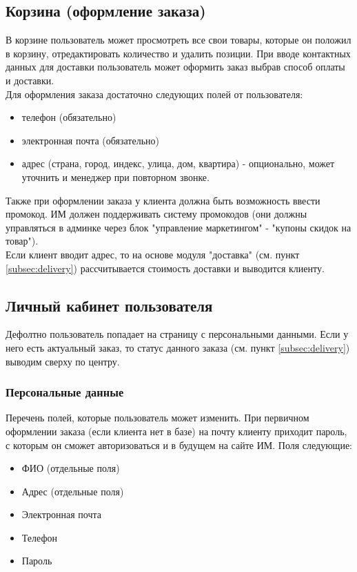 \documentclass[DIV=calc, paper=a4, fontsize=11pt]{scrartcl} %
\begin{document}
\subsection{Корзина (оформление заказа)}
В корзине пользователь может просмотреть все свои товары, которые он положил в корзину, отредактировать количество и удалить позиции. При вводе контактных данных для доставки пользователь может оформить заказ выбрав способ оплаты и доставки.
\\[0.5cm]
Для оформления заказа достаточно следующих полей от пользователя:
\begin{itemize}
	\item телефон (обязательно)
	\item электронная почта (обязательно)
	\item адрес (страна, город, индекс, улица, дом, квартира) - опционально, может уточнить и менеджер при повторном звонке.
\end{itemize}

Также при оформлении заказа у клиента должна быть возможность ввести промокод. ИМ должен поддерживать систему промокодов (они должны управляться в админке через блок "управление маркетингом" - "купоны скидок на товар").
\\[0.5cm]
Если клиент вводит адрес, то на основе модуля "доставка" (см. пункт \ref{subsec:delivery}) рассчитывается стоимость доставки и выводится клиенту.

\subsection{Личный кабинет пользователя}
Дефолтно пользователь попадает на страницу с персональными данными. Если у него есть актуальный заказ, то статус данного заказа (см. пункт \ref{subsec:delivery}) выводим сверху по центру.

\subsubsection{Персональные данные}
Перечень полей, которые пользователь может изменить. При первичном оформлении заказа (если клиента нет в базе) на почту клиенту приходит пароль, с которым он сможет авторизоваться и в будущем на сайте ИМ. Поля следующие:
\begin{itemize}
	\item ФИО (отдельные поля)
	\item Адрес (отдельные поля)
	\item Электронная почта
	\item Телефон
	\item Пароль
\end{itemize}
\end{document}
